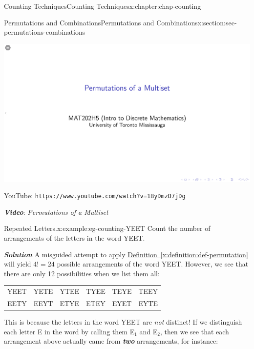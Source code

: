 \documentclass[oneside,10pt,]{book}
\newcommand{\tabularfont}{\relax}
\newcommand{\xreffont}{\relax}
\newcommand{\mono}[1]{\texttt{#1}}
\newcommand{\alert}[1]{\textbf{\textit{#1}}}
\numberwithin{equation}{section}
\newlength{\qrsize}
\newlength{\previewwidth}
\begin{document}
\begin{chapterptx}{Counting Techniques}{}{Counting Techniques}{}{}{x:chapter:chap-counting}
\begin{sectionptx}{Permutations and Combinations}{}{Permutations and Combinations}{}{}{x:section:sec-permutations-combinations}
\begin{sidebyside}{1}{0}{0}{0}
\begin{sbspanel}{1}
\begin{tcbraster}[raster columns=2, raster column skip=1pt, raster halign=center, raster force size=false, raster left skip=0pt, raster right skip=0pt]
\begin{tcolorbox}[previewstyle, width=\previewwidth]
\includegraphics[width=0.80\linewidth,height=\qrsize,keepaspectratio]{images/05-thumb.png}%
\end{tcolorbox}%
\begin{tcolorbox}[qrstyle]%
{\hypersetup{urlcolor=black}}%
\end{tcolorbox}%
\begin{tcolorbox}[captionstyle]%
\small YouTube: \mono{https://www.youtube.com/watch?v=1ByDmzD7jDg}\end{tcolorbox}%
\end{tcbraster}%
\end{sbspanel}%
\end{sidebyside}%
\par
\alert{Video}: \emph{Permutations of a Multiset}%
\begin{example}{Repeated Letters.}{x:example:eg-counting-YEET}%
Count the number of arrangements of the letters in the word YEET.%
\par
\alert{Solution} A misguided attempt to apply \hyperref[x:definition:def-permutation]{Definition~{\xreffont\ref{x:definition:def-permutation}}} will yield \(4! = 24\) possible arrangements of the word YEET. However, we see that there are only 12 possibilities when we list them all:%
\begin{sidebyside}{1}{0.2}{0.2}{0}%
\begin{sbspanel}{0.6}%
{\centering%
{\tabularfont%
\begin{tabular}{llllll}
YEET&YETE&YTEE&TYEE&TEYE&TEEY\tabularnewline[0pt]
EETY&EEYT&ETYE&ETEY&EYET&EYTE
\end{tabular}
}%
\par}
\end{sbspanel}%
\end{sidebyside}%
\par
This is because the letters in the word YEET are \emph{not} distinct! If we distinguish each letter E in the word by calling them E\(_1\) and E\(_2\), then we see that each arrangement above actually came from \alert{two} arrangements, for instance:%

\end{example}
\end{sectionptx}
\end{chapterptx}
\end{document}
